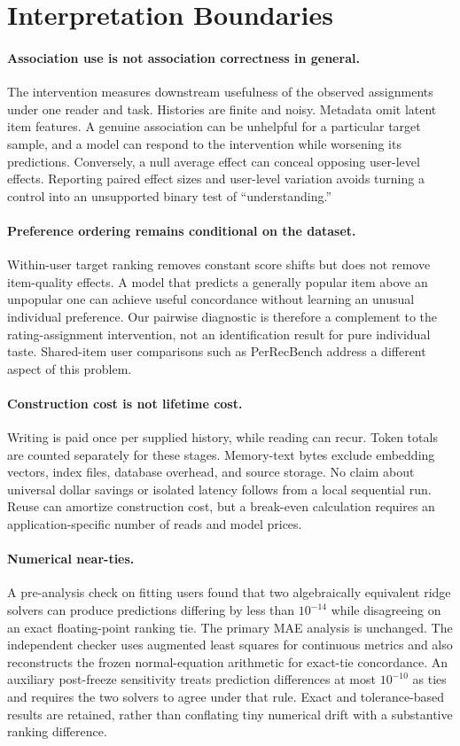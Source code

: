 \section{Interpretation Boundaries}
\label{app:limits}
\paragraph{Association use is not association correctness in general.} The intervention measures downstream usefulness of the observed assignments under one reader and task. Histories are finite and noisy. Metadata omit latent item features. A genuine association can be unhelpful for a particular target sample, and a model can respond to the intervention while worsening its predictions. Conversely, a null average effect can conceal opposing user-level effects. Reporting paired effect sizes and user-level variation avoids turning a control into an unsupported binary test of ``understanding.''

\paragraph{Preference ordering remains conditional on the dataset.} Within-user target ranking removes constant score shifts but does not remove item-quality effects. A model that predicts a generally popular item above an unpopular one can achieve useful concordance without learning an unusual individual preference. Our pairwise diagnostic is therefore a complement to the rating-assignment intervention, not an identification result for pure individual taste. Shared-item user comparisons such as PerRecBench address a different aspect of this problem.

\paragraph{Construction cost is not lifetime cost.} Writing is paid once per supplied history, while reading can recur. Token totals are counted separately for these stages. Memory-text bytes exclude embedding vectors, index files, database overhead, and source storage. No claim about universal dollar savings or isolated latency follows from a local sequential run. Reuse can amortize construction cost, but a break-even calculation requires an application-specific number of reads and model prices.

\paragraph{Numerical near-ties.} A pre-analysis check on fitting users found that two algebraically equivalent ridge solvers can produce predictions differing by less than $10^{-14}$ while disagreeing on an exact floating-point ranking tie. The primary MAE analysis is unchanged. The independent checker uses augmented least squares for continuous metrics and also reconstructs the frozen normal-equation arithmetic for exact-tie concordance. An auxiliary post-freeze sensitivity treats prediction differences at most $10^{-10}$ as ties and requires the two solvers to agree under that rule. Exact and tolerance-based results are retained, rather than conflating tiny numerical drift with a substantive ranking difference.

